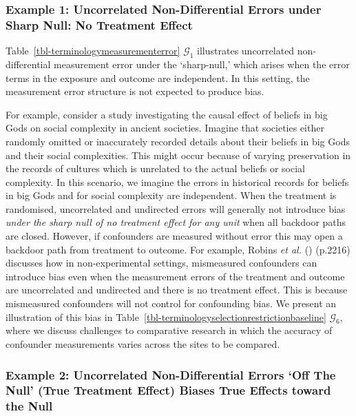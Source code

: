 \documentclass[
  single column]{article}
\begin{document}
\subsubsection{Example 1: Uncorrelated Non-Differential Errors under
Sharp Null: No Treatment
Effect}\label{example-1-uncorrelated-non-differential-errors-under-sharp-null-no-treatment-effect}

Table~\ref{tbl-terminologymeasurementerror} \(\mathcal{G}_1\)
illustrates uncorrelated non-differential measurement error under the
`sharp-null,' which arises when the error terms in the exposure and
outcome are independent. In this setting, the measurement error
structure is not expected to produce bias.

For example, consider a study investigating the causal effect of beliefs
in big Gods on social complexity in ancient societies. Imagine that
societies either randomly omitted or inaccurately recorded details about
their beliefs in big Gods and their social complexities. This might
occur because of varying preservation in the records of cultures which
is unrelated to the actual beliefs or social complexity. In this
scenario, we imagine the errors in historical records for beliefs in big
Gods and for social complexity are independent. When the treatment is
randomised, uncorrelated and undirected errors will generally not
introduce bias \emph{under the sharp null of no treatment effect for any
unit} when all backdoor paths are closed. However, if confounders are
measured without error this may open a backdoor path from treatment to
outcome. For example, Robins \emph{et al.}
() (p.2216) discusses how in
non-experimental settings, mismeasured confounders can introduce bias
even when the measurement errors of the treatment and outcome are
uncorrelated and undirected and there is no treatment effect. This is
because mismeasured confounders will not control for confounding bias.
We present an illustration of this bias in
Table~\ref{tbl-terminologyselectionrestrictionbaseline}
\(\mathcal{G}_6\), where we discuss challenges to comparative research
in which the accuracy of confounder measurements varies across the sites
to be compared.

\subsubsection{Example 2: Uncorrelated Non-Differential Errors `Off The
Null' (True Treatment Effect) Biases True Effects toward the
Null}\label{example-2-uncorrelated-non-differential-errors-off-the-null-true-treatment-effect-biases-true-effects-toward-the-null}
\end{document}
